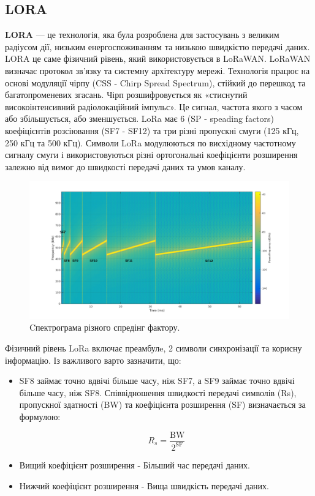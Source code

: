 \documentclass{article}
\begin{document}
\subsection{LORA}
\textbf{LORA} --- це технологія, яка була розроблена для застосувань з великим радіусом дії, низьким енергоспоживанням та низькою швидкістю передачі даних. LORA це саме фізичний рівень, який використовується в LoRaWAN. LoRaWAN визначає протокол зв'язку та системну архітектуру мережі. Технологія працює на основі модуляції чірпу (CSS -  Chirp Spread Spectrum), стійкий до перешкод та багатопроменевих згасань. Чірп розшифровується як «стиснутий високоінтенсивний радіолокаційний імпульс». Це сигнал, частота якого з часом або збільшується, або зменшується. LoRa має 6 (SP - speading factors) коефіцієнтів розсіювання (SF7 - SF12) та три різні пропускні смуги (125 кГц, 250 кГц та 500 кГц). Символи LoRa модулюються по висхідному частотному сигналу смуги  і використовуються різні ортогональні коефіцієнти розширення залежно від вимог до швидкості передачі даних та умов каналу.

\begin{figure}[h!]
	\centering
	\includegraphics[width=1\linewidth]{images/lora_chirps.png}
	\caption{\label{fig:lora_chirps} Cпектрограма різного спредінг фактору.}
\end{figure}

Фізичний рівень LoRa включає преамбулe, 2 символи синхронізації та корисну інформацію.
Із важливого варто зазначити, що:
\begin{itemize}[noitemsep, topsep=8pt]
\item SF8 займає точно вдвічі більше часу, ніж SF7, а SF9 займає точно вдвічі більше часу, ніж SF8. Співвідношення швидкості передачі символів (Rs), пропускної здатності (BW) та коефіцієнта розширення (SF) визначається за формулою:

\[
R_s = \frac{\mathrm{BW}}{2^{\mathrm{SF}}}
\]
\item Вищий коефіцієнт розширення - Більший час передачі даних.
\item Нижчий коефіцієнт розширення - Вища швидкість передачі даних.
\end{itemize}
\end{document}
